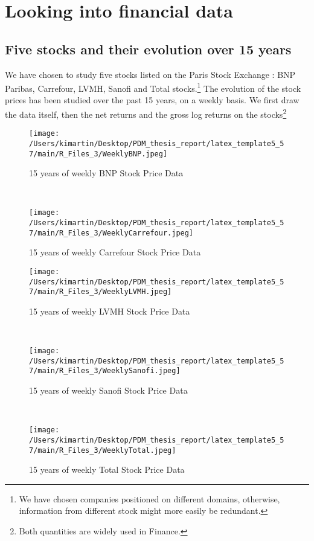 \chapter{Looking into financial data}
\section{Five stocks and their evolution over 15 years}
We have chosen to study five stocks listed on the Paris Stock Exchange : BNP Paribas, Carrefour, LVMH, Sanofi and Total stocks.\footnote{We have chosen companies positioned on different domains, otherwise, information from different stock might more easily be redundant.} The evolution of the stock prices has been studied over the past 15 years, on a weekly basis. We first draw the data itself, then the net returns and the gross log returns on the stocks\footnote{Both quantities are widely used in Finance.}
\begin{figure}[h!]
	\centering
	\begin{minipage}[b]{0.4\textwidth}
 	\centering
 	\texttt{[image: /Users/kimartin/Desktop/PDM\_thesis\_report/latex\_template5\_57/main/R\_Files\_3/WeeklyBNP.jpeg]}
 	\caption{15 years of weekly BNP Stock Price Data}
 	\label{fig:BNPStock}
	\end{minipage}
	~
	\begin{minipage}[b]{0.4\textwidth}
  	\centering
  	\texttt{[image: /Users/kimartin/Desktop/PDM\_thesis\_report/latex\_template5\_57/main/R\_Files\_3/WeeklyCarrefour.jpeg]}
  	\caption{15 years of weekly Carrefour Stock Price Data}
  	\label{fig:CarrefourStock}
	\end{minipage}
\end{figure}
\begin{figure}[h!]
	\centering
	\begin{minipage}[b]{0.4\textwidth}
   	\centering
   	\texttt{[image: /Users/kimartin/Desktop/PDM\_thesis\_report/latex\_template5\_57/main/R\_Files\_3/WeeklyLVMH.jpeg]}
   	\caption{15 years of weekly LVMH Stock Price Data}
   	\label{fig:LVMHStock}
	\end{minipage}
	~
	\begin{minipage}[b]{0.4\textwidth}
    	\centering
    	\texttt{[image: /Users/kimartin/Desktop/PDM\_thesis\_report/latex\_template5\_57/main/R\_Files\_3/WeeklySanofi.jpeg]}
    	\caption{15 years of weekly Sanofi Stock Price Data}
    	\label{fig:SanofiStock}
	\end{minipage}
	~
	\begin{minipage}[b]{0.4\textwidth}
     	\centering
     	\texttt{[image: /Users/kimartin/Desktop/PDM\_thesis\_report/latex\_template5\_57/main/R\_Files\_3/WeeklyTotal.jpeg]}
     	\caption{15 years of weekly Total Stock Price Data}
     	\label{fig:TotalStock}
	\end{minipage}
\end{figure}
\newpage
